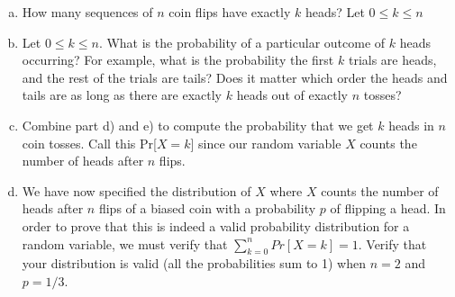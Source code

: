 \documentclass[]{article}
\newif\ifsolutions
\renewcommand{\answer}[1]{{\color{mydarkblue}\textbf{Solution:}#1}}
\begin{document}
\begin{qunlist}
\begin{enumerate}[a)]
 \ifsolutions{ \answer {
  We simply choose $1$ of the $n$ flips to be a head so we get $\binom{n}{1}=n$.
  }} 
  \fi
\qpart
\item How many sequences of $n$ coin flips have exactly $k$ heads? Let  $0 \leq k \leq n$

 \ifsolutions{ \answer {
  This time, we count the ways to choose $k$ of the $n$ flips to be a head, so we get $\binom{n}{k}$.
  }} 
  \fi 
\qpart
\item  Let  $0 \leq k \leq n$. What is the probability of a particular
  outcome of $k$ heads occurring? For example, what is the probability
  the first $k$ trials are heads, and the rest of the trials are
  tails? Does it matter which order the heads and tails are as long as
  there are exactly $k$ heads out of exactly $n$ tosses?
\qpart

 \ifsolutions{ \answer {
  Again, because the coin tosses are independent, we multiply the probability of the result of each coin toss. Since we have $k$ heads, the probability of those $k$ heads is $p^k$, but we still have to count the probability of the rest of the $n-k$ coins being tails, which is $(1-p)^{n-k}$. Therefore we get $p^k(1-p)^{n-k}$. It does not matter what order the heads and tails are because multiplication is commutative (that is $a*b = b*a$).
  }} 
  \fi
\item Combine part d) and e) to compute the probability that we get $k$
  heads in $n$ coin tosses. Call this Pr[$X = k$] since our random variable $X$ counts the number of heads after $n$ flips. 
  
 \ifsolutions{ \answer {
  Part e) computes the probability of a particular sequence of $k$ heads and $n-k$ tails. Part d) counts \textit{how many} of these sequences exist. Therefore, to count the probability of getting $k$ heads in $n$ coin tosses we multiply our answer to part d) and part e). 
 \[ Pr[X = k] = \binom{n}{k}p^k(1-p)^{n-k} \]
  }} 
  \fi

\qpart
\item We have now specified the distribution of $X$ where $X$ counts
  the number of heads after $n$ flips of a biased coin with a
  probability $p$ of flipping a head. In order to prove that this is
  indeed a valid probability distribution for a random variable, we
  must verify that $\sum\nolimits_{k=0}^n Pr[X=k] = 1$. Verify that
  your distribution is valid (all the probabilities sum to 1) when
  $n=2$ and $p=1/3$.  
  

\end{enumerate}
\end{qunlist}
\end{document}
